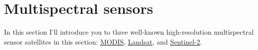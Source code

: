 \documentclass[
]{book}
\begin{document}
\hypertarget{multispectral-sensors}{%
\chapter{Multispectral sensors}\label{multispectral-sensors}}

In this section I'll introduce you to three well-known high-resolution multispectral sensor satellites in this section: \href{https://modis.gsfc.nasa.gov/}{MODIS}, \href{https://landsat.gsfc.nasa.gov/}{Landsat}, and \href{https://www.esa.int/Applications/Observing_the_Earth/Copernicus/Sentinel-2}{Sentinel-2}.

  
\end{document}
